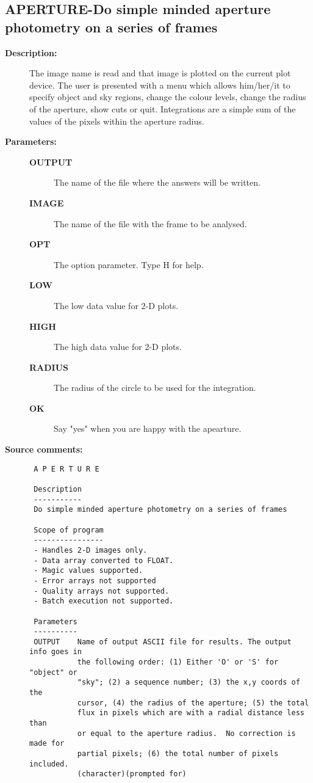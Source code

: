 \subsection{APERTURE-\label{APERTURE}Do simple minded aperture photometry on a series of frames}
\begin{description}

\item [{\bf Description:}]
 The image name is read and that image is plotted on the current
 plot device.  The user is presented with a menu which allows
 him/her/it to specify object and sky regions, change the colour
 levels, change the radius of the aperture, show cuts or quit.
 Integrations are a simple sum of the values of the pixels within
 the aperture radius.

\item [{\bf Parameters:}]
\begin{description}
\item [{\bf OUTPUT}]
 The name of the file where the answers will be written.
\item [{\bf IMAGE}]
 The name of the file with the frame to be analysed.
\item [{\bf OPT}]
 The option parameter.  Type H for help.
\item [{\bf LOW}]
 The low data value for 2-D plots.
\item [{\bf HIGH}]
 The high data value for 2-D plots.
\item [{\bf RADIUS}]
 The radius of the circle to be used for the integration.
\item [{\bf OK}]
 Say "yes" when you are happy with the apearture.
\end{description}

\item [{\bf Source comments:}]
\begin{verbatim}
 A P E R T U R E

 Description
 -----------
 Do simple minded aperture photometry on a series of frames

 Scope of program
 ----------------
 - Handles 2-D images only.
 - Data array converted to FLOAT.
 - Magic values supported.
 - Error arrays not supported
 - Quality arrays not supported.
 - Batch execution not supported.

 Parameters
 ----------
 OUTPUT    Name of output ASCII file for results. The output info goes in
           the following order: (1) Either 'O' or 'S' for "object" or
           "sky"; (2) a sequence number; (3) the x,y coords of the
           cursor, (4) the radius of the aperture; (5) the total
           flux in pixels which are with a radial distance less than
           or equal to the aperture radius.  No correction is made for
           partial pixels; (6) the total number of pixels included.
           (character)(prompted for)


\end{verbatim}
\end{description}

